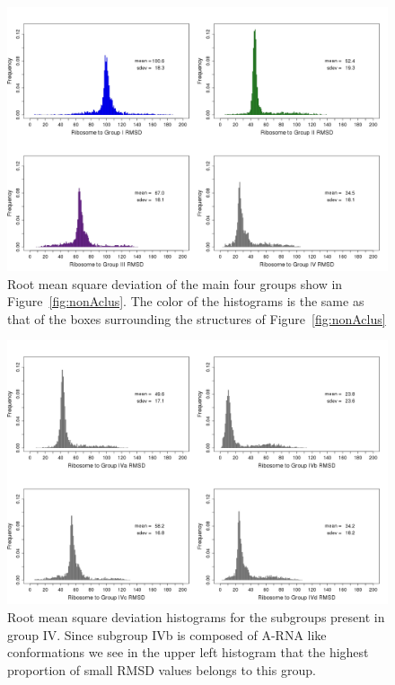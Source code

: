 \begin{figure}[htbp]
 \centering
\includegraphics[angle=90, scale=0.5]{Chapter2/RMSDschneider1.png}
\caption{Root mean square deviation of the main four groups show in
  Figure~\ref{fig:nonAclus}. The color of the histograms is the same
  as that of the boxes surrounding the structures of
  Figure~\ref{fig:nonAclus}}
 \label{fig:histo1}
\end{figure}

\begin{figure}[htbp]
 \centering
\includegraphics[angle=90, scale=0.5]{Chapter2/RMSDschneider2.png}
\caption{Root  mean  square  deviation  histograms for  the  subgroups
  present in group  IV.  Since subgroup IVb is  composed of A-RNA like
  conformations we  see in the  upper left histogram that  the highest
  proportion of small RMSD values belongs to this group.}
 \label{fig:histo2}
\end{figure}

